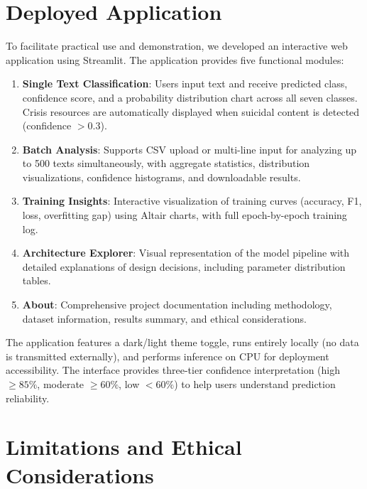 \documentclass[conference, 10pt]{IEEEtran}
\begin{document}
\section{Deployed Application}

To facilitate practical use and demonstration, we developed an interactive web application using Streamlit. The application provides five functional modules:

\begin{enumerate}[noitemsep]
    \item \textbf{Single Text Classification}: Users input text and receive predicted class, confidence score, and a probability distribution chart across all seven classes. Crisis resources are automatically displayed when suicidal content is detected (confidence $> 0.3$).
    \item \textbf{Batch Analysis}: Supports CSV upload or multi-line input for analyzing up to 500 texts simultaneously, with aggregate statistics, distribution visualizations, confidence histograms, and downloadable results.
    \item \textbf{Training Insights}: Interactive visualization of training curves (accuracy, F1, loss, overfitting gap) using Altair charts, with full epoch-by-epoch training log.
    \item \textbf{Architecture Explorer}: Visual representation of the model pipeline with detailed explanations of design decisions, including parameter distribution tables.
    \item \textbf{About}: Comprehensive project documentation including methodology, dataset information, results summary, and ethical considerations.
\end{enumerate}

The application features a dark/light theme toggle, runs entirely locally (no data is transmitted externally), and performs inference on CPU for deployment accessibility. The interface provides three-tier confidence interpretation (high $\geq 85\%$, moderate $\geq 60\%$, low $< 60\%$) to help users understand prediction reliability.


\section{Limitations and Ethical Considerations}
\end{document}
